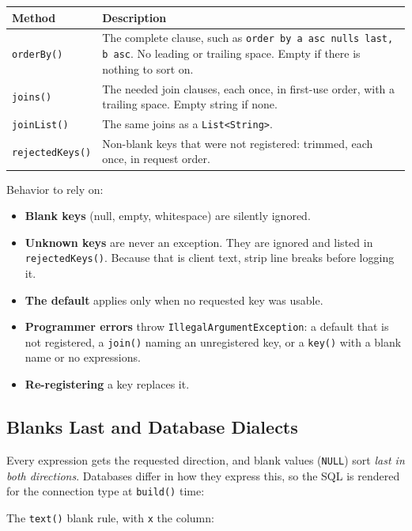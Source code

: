 \begin{longtable}{P{3.4cm}P{7.1cm}}
\toprule
\textbf{Method} & \textbf{Description} \\
\midrule
\endhead
\texttt{orderBy()} & The complete clause, such as \texttt{order by a asc nulls last, b asc}.  No leading or trailing space.  Empty if there is nothing to sort on. \\
\texttt{joins()} & The needed join clauses, each once, in first-use order, with a trailing space.  Empty string if none. \\
\texttt{joinList()} & The same joins as a \texttt{List<String>}. \\
\texttt{rejectedKeys()} & Non-blank keys that were not registered: trimmed, each once, in request order. \\
\bottomrule
\end{longtable}

Behavior to rely on:

\begin{itemize}
  \item \textbf{Blank keys} (null, empty, whitespace) are silently ignored.
  \item \textbf{Unknown keys} are never an exception.  They are ignored and listed in \texttt{rejectedKeys()}.  Because that is client text, strip line breaks before logging it.
  \item \textbf{The default} applies only when no requested key was usable.
  \item \textbf{Programmer errors} throw \texttt{IllegalArgumentException}: a default that is not registered, a \texttt{join()} naming an unregistered key, or a \texttt{key()} with a blank name or no expressions.
  \item \textbf{Re-registering} a key replaces it.
\end{itemize}

\subsection{Blanks Last and Database Dialects}
\label{sec:qb-sortbuilder-dialects}

Every expression gets the requested direction, and blank values (\texttt{NULL}) sort \emph{last in both directions}.  Databases differ in how they express this, so the SQL is rendered for the connection type at \texttt{build()} time:

The \texttt{text()} blank rule, with \texttt{x} the column:

